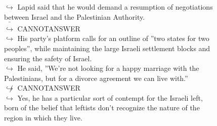 \documentclass[11pt,a4paper, onecolumn]{article}
\begin{document}
\begin{figure}[t] \small \begin{tcolorbox}[boxsep=0pt,left=5pt,right=0pt,top=2pt,colback = yellow!5] \begin{dialogue}
 \small 
\colorbox{pink!25}{$\hookrightarrow$}
{ Lapid said that he would demand a resumption of negotiations between Israel and the Palestinian Authority. }
\\
\colorbox{pink!25}{ $\bar{\hookrightarrow}$}
{ CANNOTANSWER }
\\
\colorbox{pink!25}{$\hookrightarrow$}
{ His party's platform calls for an outline of ''two states for two peoples'', while maintaining the large Israeli settlement blocks and ensuring the safety of Israel. }
\\
\colorbox{pink!25}{$\hookrightarrow$}
{ He said, ''We're not looking for a happy marriage with the Palestinians, but for a divorce agreement we can live with.'' }
\\
\colorbox{pink!25}{$\not\hookrightarrow$}
{ CANNOTANSWER }
\\
\colorbox{pink!25}{$\hookrightarrow$}
\colorbox{red!25}{Yes,}
{ he has a particular sort of contempt for the Israeli left, born of the belief that leftists don't recognize the nature of the region in which they live. }
\\
 \end{dialogue}\end{tcolorbox}\end{figure}
\end{document}
